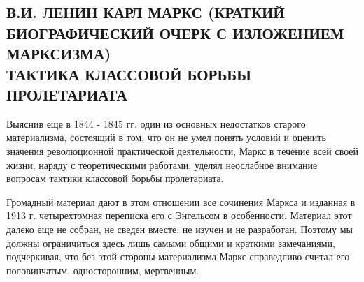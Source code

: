 \documentclass[12pt]{article}
\newcommand{\parnum}{(\arabic{parcount})}
\newcounter{parcount}
\newenvironment{parnumbers}{%
  \par%
  \everypar{\noindent \stepcounter{parcount}\marginpar[]{\parnum}}%
}{}
\begin{document}
\subsection{В.И. ЛЕНИН КАРЛ МАРКС (КРАТКИЙ БИОГРАФИЧЕСКИЙ ОЧЕРК С ИЗЛОЖЕНИЕМ МАРКСИЗМА)\\
    ТАКТИКА КЛАССОВОЙ БОРЬБЫ ПРОЛЕТАРИАТА}
\begin{parnumbers}
      Выяснив еще в 1844 - 1845 гг. один из основных недостатков старого материализма, состоящий в том, что он не умел понять условий и оценить значения революционной практической деятельности, Маркс в течение всей своей жизни, наряду с теоретическими работами, уделял неослабное внимание вопросам тактики классовой борьбы пролетариата.

    Громадный материал дают в этом отношении все сочинения Маркса и изданная в 1913 г. четырехтомная переписка его с Энгельсом в особенности. Материал этот далеко еще не собран, не сведен вместе, не изучен и не разработан. Поэтому мы должны ограничиться здесь лишь самыми общими и краткими замечаниями, подчеркивая, что без этой стороны материализма Маркс справедливо считал его половинчатым, односторонним, мертвенным.


\end{parnumbers}
\end{document}
